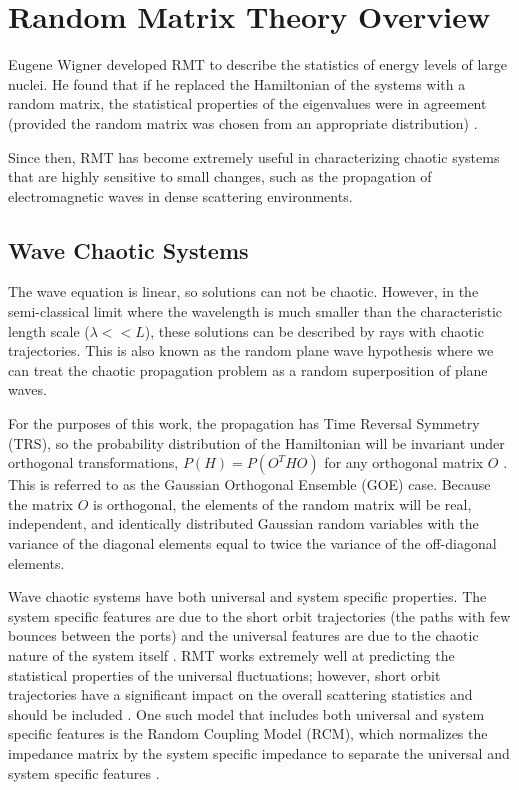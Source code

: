 \renewcommand{\baselinestretch}{2} \small\normalsize
\chapter{Random Matrix Theory Overview}
Eugene Wigner developed RMT to describe the statistics of energy levels of large nuclei. He found that if he replaced the Hamiltonian of the systems with a random matrix, the statistical properties of the eigenvalues were in agreement (provided the random matrix was chosen from an appropriate distribution) \cite{ott_chaos}.

Since then, RMT has become extremely useful in characterizing chaotic systems that are highly sensitive to small changes, such as the propagation of electromagnetic waves in dense scattering environments.

\section{Wave Chaotic Systems}
The wave equation is linear, so solutions can not be chaotic. However, in the semi-classical limit where the wavelength is much smaller than the characteristic length scale ($\lambda << L$), these solutions can be described by rays with chaotic trajectories. This is also known as the random plane wave hypothesis where we can treat the chaotic propagation problem as a random superposition of plane waves.

For the purposes of this work, the propagation has Time Reversal Symmetry (TRS), so the probability distribution of the Hamiltonian will be invariant under orthogonal transformations, $P(H) = P(O^THO)$ for any orthogonal matrix $O$ \cite{ott_chaos}. This is referred to as the Gaussian Orthogonal Ensemble (GOE) case. Because the matrix $O$ is orthogonal, the elements of the random matrix will be real, independent, and identically distributed Gaussian random variables with the variance of the diagonal elements equal to twice the variance of the off-diagonal elements.

Wave chaotic systems have both universal and system specific properties. The system specific features are due to the short orbit trajectories (the paths with few bounces between the ports) and the universal features are due to the chaotic nature of the system itself \cite{bohigas}. RMT works extremely well at predicting the statistical properties of the universal fluctuations; however, short orbit trajectories have a significant impact on the overall scattering statistics and should be included \cite{hart_so} \cite{yeh_universal}. One such model that includes both universal and system specific features is the Random Coupling Model (RCM), which normalizes the impedance matrix by the system specific impedance to separate the universal and system specific features  \cite{zheng_single} \cite{zheng_multiple} \cite{hemmady_review} \cite{gradoni_review}.


